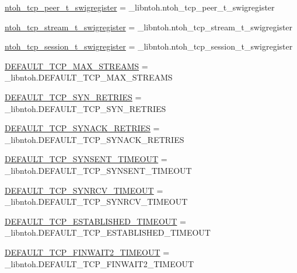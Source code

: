 \begin{DoxyCompactItemize}
\item 
\hyperlink{namespacelibntoh_aac2da66c99ac56fc944321590d30ef28}{ntoh\-\_\-tcp\-\_\-peer\-\_\-t\-\_\-swigregister} = \-\_\-libntoh.\-ntoh\-\_\-tcp\-\_\-peer\-\_\-t\-\_\-swigregister
\item 
\hyperlink{namespacelibntoh_a66a2cec13a35ebc1e69cd06a2850cd54}{ntoh\-\_\-tcp\-\_\-stream\-\_\-t\-\_\-swigregister} = \-\_\-libntoh.\-ntoh\-\_\-tcp\-\_\-stream\-\_\-t\-\_\-swigregister
\item 
\hyperlink{namespacelibntoh_a3d7e662b4d968484bebf6aecddd670bb}{ntoh\-\_\-tcp\-\_\-session\-\_\-t\-\_\-swigregister} = \-\_\-libntoh.\-ntoh\-\_\-tcp\-\_\-session\-\_\-t\-\_\-swigregister
\item 
\hyperlink{namespacelibntoh_a61cf1ff1337978eb2d133ed4c2d113fb}{D\-E\-F\-A\-U\-L\-T\-\_\-\-T\-C\-P\-\_\-\-M\-A\-X\-\_\-\-S\-T\-R\-E\-A\-M\-S} = \-\_\-libntoh.\-D\-E\-F\-A\-U\-L\-T\-\_\-\-T\-C\-P\-\_\-\-M\-A\-X\-\_\-\-S\-T\-R\-E\-A\-M\-S
\item 
\hyperlink{namespacelibntoh_ab8a5939ea35e108b4dade15a8192fb2c}{D\-E\-F\-A\-U\-L\-T\-\_\-\-T\-C\-P\-\_\-\-S\-Y\-N\-\_\-\-R\-E\-T\-R\-I\-E\-S} = \-\_\-libntoh.\-D\-E\-F\-A\-U\-L\-T\-\_\-\-T\-C\-P\-\_\-\-S\-Y\-N\-\_\-\-R\-E\-T\-R\-I\-E\-S
\item 
\hyperlink{namespacelibntoh_a7b1305649d03ad9e8472ceb5b4bf8a66}{D\-E\-F\-A\-U\-L\-T\-\_\-\-T\-C\-P\-\_\-\-S\-Y\-N\-A\-C\-K\-\_\-\-R\-E\-T\-R\-I\-E\-S} = \-\_\-libntoh.\-D\-E\-F\-A\-U\-L\-T\-\_\-\-T\-C\-P\-\_\-\-S\-Y\-N\-A\-C\-K\-\_\-\-R\-E\-T\-R\-I\-E\-S
\item 
\hyperlink{namespacelibntoh_af2bb51e0cd1e0bc0be60463e4ad2afc8}{D\-E\-F\-A\-U\-L\-T\-\_\-\-T\-C\-P\-\_\-\-S\-Y\-N\-S\-E\-N\-T\-\_\-\-T\-I\-M\-E\-O\-U\-T} = \-\_\-libntoh.\-D\-E\-F\-A\-U\-L\-T\-\_\-\-T\-C\-P\-\_\-\-S\-Y\-N\-S\-E\-N\-T\-\_\-\-T\-I\-M\-E\-O\-U\-T
\item 
\hyperlink{namespacelibntoh_afe658f0343f6bbf1d6ac8cab3d70b668}{D\-E\-F\-A\-U\-L\-T\-\_\-\-T\-C\-P\-\_\-\-S\-Y\-N\-R\-C\-V\-\_\-\-T\-I\-M\-E\-O\-U\-T} = \-\_\-libntoh.\-D\-E\-F\-A\-U\-L\-T\-\_\-\-T\-C\-P\-\_\-\-S\-Y\-N\-R\-C\-V\-\_\-\-T\-I\-M\-E\-O\-U\-T
\item 
\hyperlink{namespacelibntoh_afbc0e8c5bad6756e09f1a0727e686156}{D\-E\-F\-A\-U\-L\-T\-\_\-\-T\-C\-P\-\_\-\-E\-S\-T\-A\-B\-L\-I\-S\-H\-E\-D\-\_\-\-T\-I\-M\-E\-O\-U\-T} = \-\_\-libntoh.\-D\-E\-F\-A\-U\-L\-T\-\_\-\-T\-C\-P\-\_\-\-E\-S\-T\-A\-B\-L\-I\-S\-H\-E\-D\-\_\-\-T\-I\-M\-E\-O\-U\-T
\item 
\hyperlink{namespacelibntoh_a4231bcce846eee2460b9764c4947471e}{D\-E\-F\-A\-U\-L\-T\-\_\-\-T\-C\-P\-\_\-\-F\-I\-N\-W\-A\-I\-T2\-\_\-\-T\-I\-M\-E\-O\-U\-T} = \-\_\-libntoh.\-D\-E\-F\-A\-U\-L\-T\-\_\-\-T\-C\-P\-\_\-\-F\-I\-N\-W\-A\-I\-T2\-\_\-\-T\-I\-M\-E\-O\-U\-T

\end{DoxyCompactItemize}
